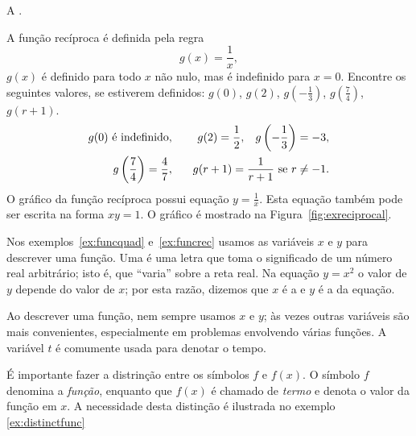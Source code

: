\begin{example}\label{ex:funcrec}
A .

A função recíproca é definida pela regra
\[
  g(x) = \frac{1}{x},
\]
$g(x)$ é definido para todo $x$ não nulo, mas é indefinido para
$x = 0$. Encontre os seguintes valores, se estiverem definidos:
$g(0)$, $g(2)$, $g\left(-\frac{1}{3}\right)$,
$g\left(\frac{7}{4}\right)$, $g(r+1)$.
\begin{eqnarray*}
  g(0) \text{ é indefinido}, & \hspace{2ex} & g(2) = \frac{1}{2}, \hspace{2ex} g\left(-\frac{1}{3}\right) = -3, \\
  g\left(\frac{7}{4}\right) = \frac{4}{7}, & & g(r+1) = \frac{1}{r + 1} \text{ se } r \ne -1.
\end{eqnarray*}
O gráfico da função recíproca possui equação $y = \frac{1}{x}$. Esta
equação também pode ser escrita na forma $x y = 1$. O gráfico é
mostrado na Figura~\ref{fig:exreciprocal}.
\end{example}

Nos exemplos~\ref{ex:funcquad} e~\ref{ex:funcrec} usamos as variáveis
$x$ e $y$ para descrever uma função. Uma  é uma
letra que toma o significado de um número real arbitrário; isto é,
que ``varia'' sobre a reta real. Na equação $y = x^2$ o valor de $y$
depende do valor de $x$; por esta razão, dizemos que $x$ é a
 e $y$ é a
 da equação.

Ao descrever uma função, nem sempre usamos $x$ e $y$;
às vezes outras variáveis são mais convenientes, especialmente
em problemas envolvendo várias funções. A variável $t$ é comumente
usada para denotar o tempo.

É importante fazer a distrinção entre os símbolos $f$ e 
$f(x)$. O símbolo $f$ denomina a \emph{função}, enquanto que
$f(x)$ é chamado de \emph{termo} e denota o valor da função
em $x$. A necessidade desta distinção é ilustrada no exemplo~%
\ref{ex:distinctfunc}

